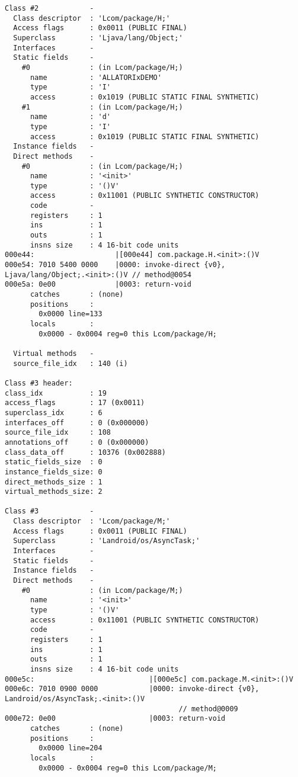 \begin{lstlisting}
Class #2            -
  Class descriptor  : 'Lcom/package/H;'
  Access flags      : 0x0011 (PUBLIC FINAL)
  Superclass        : 'Ljava/lang/Object;'
  Interfaces        -
  Static fields     -
    #0              : (in Lcom/package/H;)
      name          : 'ALLATORIxDEMO'
      type          : 'I'
      access        : 0x1019 (PUBLIC STATIC FINAL SYNTHETIC)
    #1              : (in Lcom/package/H;)
      name          : 'd'
      type          : 'I'
      access        : 0x1019 (PUBLIC STATIC FINAL SYNTHETIC)
  Instance fields   -
  Direct methods    -
    #0              : (in Lcom/package/H;)
      name          : '<init>'
      type          : '()V'
      access        : 0x11001 (PUBLIC SYNTHETIC CONSTRUCTOR)
      code          -
      registers     : 1
      ins           : 1
      outs          : 1
      insns size    : 4 16-bit code units
000e44:                   |[000e44] com.package.H.<init>:()V
000e54: 7010 5400 0000    |0000: invoke-direct {v0}, Ljava/lang/Object;.<init>:()V // method@0054
000e5a: 0e00              |0003: return-void
      catches       : (none)
      positions     :
        0x0000 line=133
      locals        :
        0x0000 - 0x0004 reg=0 this Lcom/package/H;

  Virtual methods   -
  source_file_idx   : 140 (i)

Class #3 header:
class_idx           : 19
access_flags        : 17 (0x0011)
superclass_idx      : 6
interfaces_off      : 0 (0x000000)
source_file_idx     : 108
annotations_off     : 0 (0x000000)
class_data_off      : 10376 (0x002888)
static_fields_size  : 0
instance_fields_size: 0
direct_methods_size : 1
virtual_methods_size: 2

Class #3            -
  Class descriptor  : 'Lcom/package/M;'
  Access flags      : 0x0011 (PUBLIC FINAL)
  Superclass        : 'Landroid/os/AsyncTask;'
  Interfaces        -
  Static fields     -
  Instance fields   -
  Direct methods    -
    #0              : (in Lcom/package/M;)
      name          : '<init>'
      type          : '()V'
      access        : 0x11001 (PUBLIC SYNTHETIC CONSTRUCTOR)
      code          -
      registers     : 1
      ins           : 1
      outs          : 1
      insns size    : 4 16-bit code units
000e5c:                           |[000e5c] com.package.M.<init>:()V
000e6c: 7010 0900 0000            |0000: invoke-direct {v0}, Landroid/os/AsyncTask;.<init>:()V
                                         // method@0009
000e72: 0e00                      |0003: return-void
      catches       : (none)
      positions     :
        0x0000 line=204
      locals        :
        0x0000 - 0x0004 reg=0 this Lcom/package/M;


\end{lstlisting}
